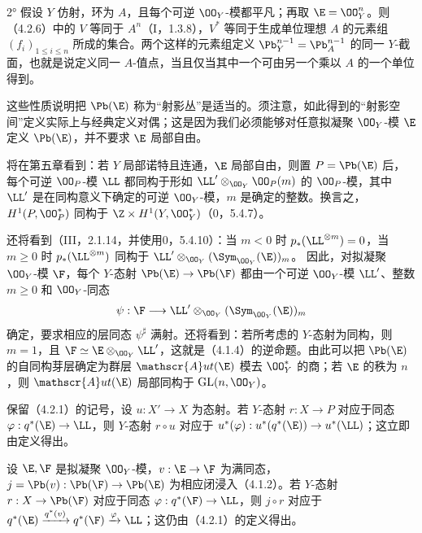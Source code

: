 2° 假设 $Y$ 仿射，环为 $A$，且每个可逆 $\OO_Y$-模都平凡；再取 $\E=\OO_Y^n$。则（4.2.6）中的 $V$ 等同于 $A^n$（I，1.3.8），$V^*$ 等同于生成单位理想 $A$ 的元素组 $(f_i)_{1\leq i\leq n}$ 所成的集合。两个这样的元素组定义 $\Pb_Y^{n-1}=\Pb_A^{n-1}$ 的同一 $Y$-截面，也就是说定义同一 $A$-值点，当且仅当其中一个可由另一个乘以 $A$ 的一个单位得到。

这些性质说明把 $\Pb(\E)$ 称为“射影丛”是适当的。须注意，如此得到的“射影空间”定义实际上与经典定义对偶；这是因为我们必须能够对任意拟凝聚 $\OO_Y$-模 $\E$ 定义 $\Pb(\E)$，并不要求 $\E$ 局部自由。

将在第五章看到：若 $Y$ 局部诺特且连通，$\E$ 局部自由，则置 $P=\Pb(\E)$ 后，每个可逆 $\OO_P$-模 $\LL$ 都同构于形如 $\LL'\otimes_{\OO_Y}\OO_P(m)$ 的 $\OO_P$-模，其中 $\LL'$ 是在同构意义下确定的可逆 $\OO_Y$-模，$m$ 是确定的整数。换言之，$H^1(P,\OO_P^*)$ 同构于 $\Z\times H^1(Y,\OO_Y^*)$（0，5.4.7）。

还将看到（III，2.1.14，并使用0，5.4.10）：当 $m<0$ 时 $p_*(\LL^{\otimes m})=0$，当 $m\geq0$ 时 $p_*(\LL^{\otimes m})$ 同构于 $\LL'\otimes_{\OO_Y}(\Sym_{\OO_Y}(\E))_m$。
因此，对拟凝聚 $\OO_Y$-模 $\F$，每个 $Y$-态射 $\Pb(\E)\to\Pb(\F)$ 都由一个可逆 $\OO_Y$-模 $\LL'$、整数 $m\geq0$ 和 $\OO_Y$-同态
\[
\psi:\F\longrightarrow\LL'\otimes_{\OO_Y}(\Sym_{\OO_Y}(\E))_m
\]
确定，要求相应的层同态 $\psi^\sharp$ 满射。还将看到：若所考虑的 $Y$-态射为同构，则 $m=1$，且 $\F\simeq\E\otimes_{\OO_Y}\LL'$，这就是（4.1.4）的逆命题。由此可以把 $\Pb(\E)$ 的自同构芽层确定为群层 $\mathscr{A}ut(\E)$ 模去 $\OO_Y^*$ 的商；若 $\E$ 的秩为 $n$，则 $\mathscr{A}ut(\E)$ 局部同构于 $\operatorname{GL}(n,\OO_Y)$。

保留（4.2.1）的记号，设 $u:X'\to X$ 为态射。若 $Y$-态射 $r:X\to P$ 对应于同态 $\varphi:q^*(\E)\to\LL$，则 $Y$-态射 $r\circ u$ 对应于
$u^*(\varphi):u^*(q^*(\E))\to u^*(\LL)$；这立即由定义得出。

设 $\E,\F$ 是拟凝聚 $\OO_Y$-模，$v:\E\to\F$ 为满同态，$j=\Pb(v):\Pb(\F)\to\Pb(\E)$ 为相应闭浸入（4.1.2）。若 $Y$-态射 $r:X\to\Pb(\F)$ 对应于同态 $\varphi:q^*(\F)\to\LL$，则 $j\circ r$ 对应于
$q^*(\E)\xrightarrow{q^*(v)}q^*(\F)\xrightarrow{\varphi}\LL$；这仍由（4.2.1）的定义得出。

